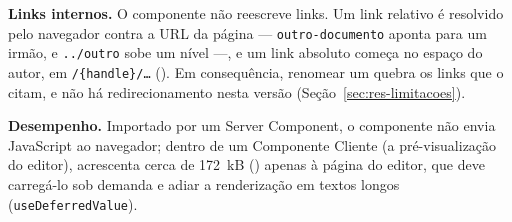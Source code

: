 \textbf{Links internos.} O componente não reescreve links. Um link relativo é resolvido pelo navegador contra a URL da página --- \texttt{outro-documento} aponta para um irmão, e \texttt{../outro} sobe um nível ---, e um link absoluto começa no espaço do autor, em \texttt{/\{handle\}/\ldots} (). Em consequência, renomear um  quebra os links que o citam, e não há redirecionamento nesta versão (Seção~\ref{sec:res-limitacoes}).

\textbf{Desempenho.} Importado por um Server Component, o componente não envia JavaScript ao navegador; dentro de um Componente Cliente (a pré-visualização do editor), acrescenta cerca de 172~kB () apenas à página do editor, que deve carregá-lo sob demanda e adiar a renderização em textos longos (\texttt{useDeferredValue}).

